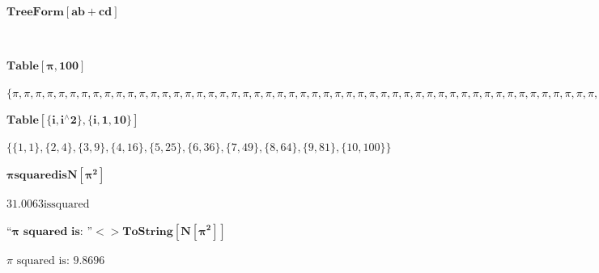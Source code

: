 \documentclass{article}
\begin{document}
\begin{doublespace}
\noindent\(\pmb{\text{TreeForm}[a b + c d]}\)
\end{doublespace}

\begin{doublespace}
\noindent\(\)
\end{doublespace}

\begin{doublespace}
\noindent\(\pmb{\text{Table}[\pi ,100]}\)
\end{doublespace}

\begin{doublespace}
\noindent\(\{\pi ,\pi ,\pi ,\pi ,\pi ,\pi ,\pi ,\pi ,\pi ,\pi ,\pi ,\pi ,\pi ,\pi ,\pi ,\pi ,\pi ,\pi ,\pi ,\pi ,\pi ,\pi ,\pi ,\pi ,\pi ,\pi ,\pi
,\pi ,\pi ,\pi ,\pi ,\pi ,\pi ,\pi ,\pi ,\pi ,\pi ,\pi ,\pi ,\pi ,\pi ,\pi ,\pi ,\pi ,\pi ,\pi ,\pi ,\pi ,\pi ,\pi ,\pi ,\pi ,\pi ,\pi ,\pi ,\pi
,\pi ,\pi ,\pi ,\pi ,\pi ,\pi ,\pi ,\pi ,\pi ,\pi ,\pi ,\pi ,\pi ,\pi ,\pi ,\pi ,\pi ,\pi ,\pi ,\pi ,\pi ,\pi ,\pi ,\pi ,\pi ,\pi ,\pi ,\pi ,\pi
,\pi ,\pi ,\pi ,\pi ,\pi ,\pi ,\pi ,\pi ,\pi ,\pi ,\pi ,\pi ,\pi ,\pi ,\pi \}\)
\end{doublespace}

\begin{doublespace}
\noindent\(\pmb{\text{Table}[\{i,i{}^{\wedge}2\},\{i,1,10\}]}\)
\end{doublespace}

\begin{doublespace}
\noindent\(\{\{1,1\},\{2,4\},\{3,9\},\{4,16\},\{5,25\},\{6,36\},\{7,49\},\{8,64\},\{9,81\},\{10,100\}\}\)
\end{doublespace}

\begin{doublespace}
\noindent\(\pmb{\pi  \text{squared} \text{is} N\left[\pi ^2\right]}\)
\end{doublespace}

\begin{doublespace}
\noindent\(31.0063 \text{is} \text{squared}\)
\end{doublespace}

\begin{doublespace}
\noindent\(\pmb{\text{{``}$\pi $ squared is: {''}}<>\text{ToString}\left[N\left[\pi ^2\right]\right]}\)
\end{doublespace}

\begin{doublespace}
\noindent\(\text{$\pi $ squared is: 9.8696}\)
\end{doublespace}
\end{document}

